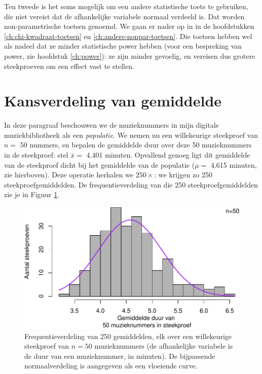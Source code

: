 \documentclass[
]{book}
\begin{document}
Ten tweede is het soms mogelijk om een andere statistische toets te
gebruiken, die niet vereist dat de afhankelijke variabele normaal
verdeeld is. Dat worden non-parametrische toetsen genoemd. We gaan er
nader op in in de hoofdstukken \ref{ch:chi-kwadraat-toetsen} en
\ref{ch:andere-nonpar-toetsen}.
Die toetsen hebben wel als nadeel
dat ze minder statistische power hebben (voor een bespreking van power,
zie hoofdstuk \ref{ch:power}): ze zijn minder gevoelig, en vereisen dus grotere
steekproeven om een effect vast te stellen.

\hypertarget{sec:CentraalLimietTheorema}{%
\section{Kansverdeling van gemiddelde}\label{sec:CentraalLimietTheorema}}

In deze paragraaf beschouwen we de muzieknummers in mijn digitale
muziekbibliotheek als een \emph{populatie}. We nemen nu een willekeurige
steekproef van \(n=\) 50 nummers, en bepalen de gemiddelde duur over deze
50 muzieknummers in de steekproef:
stel \(\bar{x} =\) 4.401 minuten. Opvallend
genoeg ligt dit gemiddelde van de steekproef dicht bij het gemiddelde
van de populatie (\(\mu =\) 4.615 minuten, zie hierboven).
Deze operatie herhalen we
\(250\times\): we krijgen zo 250 steekproefgemiddelden. De
frequentieverdeling van die 250 steekproefgemiddelden zie je in
Figuur \ref{fig:itunesmeanshist}.

\begin{figure}
\centering
\includegraphics{KMS-NL_files/figure-latex/itunesmeanshist-1.pdf}
\caption{\label{fig:itunesmeanshist}Frequentieverdeling van 250 gemiddelden, elk over een willekeurige steekproef van \(n=50\) muzieknummers (de afhankelijke variabele is de duur van een muzieknummer, in minuten). De bijpassende normaalverdeling is aangegeven als een vloeiende curve.}
\end{figure}
\end{document}
